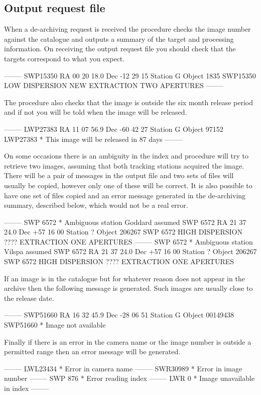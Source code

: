 \documentclass[11pt,twoside,nolof,noabs]{starlink}
\begin{document}
\subsection{Output request file}
When a de-archiving request is received the procedure checks the image number
against the catalogue and outputs a summary of the target and processing
information.
On receiving the output request file you should check that the targets
correspond to what you expect.
\begin{terminalv}
 --------
 SWP15350  RA 00 20 18.0  Dec -12 29 15  Station G  Object 1835
 SWP15350  LOW  DISPERSION  NEW  EXTRACTION TWO  APERTURES
 --------
\end{terminalv}
The procedure also checks that the image is outside the six month release
period and if not you will be told when the image will be released.
\begin{terminalv}
 --------
 LWP27383  RA 11 07 56.9  Dec -60 42 27  Station G  Object    97152
 LWP27383 * This image will be released in  87 days
 --------
\end{terminalv}
On some occasions there is an ambiguity in the index and procedure will try to
retrieve two images, assuming that both tracking stations acquired the image.
There will be a pair of messages in the output file and two sets of files will
usually be copied, however only one of these will be correct. It is also
possible to have one set of files copied and an error message generated in the
de-archiving summary, described below, which would not be a real
error.
\begin{terminalv}
--------
SWP 6572 * Ambiguous station Goddard assumed
SWP 6572  RA 21 37 24.0  Dec +57 16 00  Station ?  Object 206267
SWP 6572  HIGH DISPERSION  ???? EXTRACTION ONE  APERTURES
--------
SWP 6572 * Ambiguous station Vilspa assumed
SWP 6572  RA 21 37 24.0  Dec +57 16 00  Station ?  Object 206267
SWP 6572  HIGH DISPERSION  ???? EXTRACTION ONE  APERTURES
\end{terminalv}
If an image is in the catalogue but for whatever reason does not appear in the
archive then the following message is generated. Such images are usually close
to the release date.
\begin{terminalv}
--------
SWP51660  RA 16 32 45.9  Dec -28 06 51  Station G  Object 00149438
SWP51660 * Image not available
\end{terminalv}
Finally if there is an error in the camera name or the image number is outside
a permitted range then an error message will be generated.
\begin{terminalv}
--------
LWL23434 * Error in camera name
--------
SWR30989 * Error in image number
--------
SWP  876 * Error reading index
--------
LWR    0 * Image unavailable in index
--------
\end{terminalv}
\end{document}
